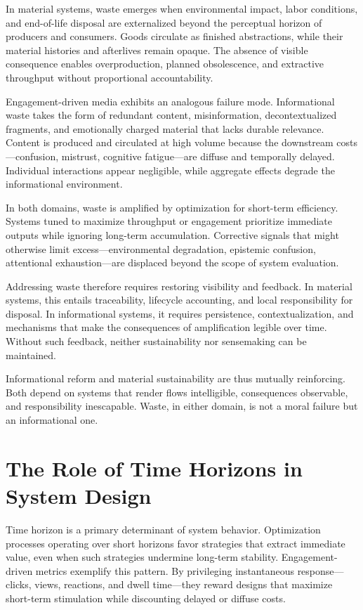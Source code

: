 \documentclass[12pt]{article}
\begin{document}
In material systems, waste emerges when environmental impact, labor conditions, and end-of-life disposal are externalized beyond the perceptual horizon of producers and consumers. Goods circulate as finished abstractions, while their material histories and afterlives remain opaque. The absence of visible consequence enables overproduction, planned obsolescence, and extractive throughput without proportional accountability.

Engagement-driven media exhibits an analogous failure mode. Informational waste takes the form of redundant content, misinformation, decontextualized fragments, and emotionally charged material that lacks durable relevance. Content is produced and circulated at high volume because the downstream costs—confusion, mistrust, cognitive fatigue—are diffuse and temporally delayed. Individual interactions appear negligible, while aggregate effects degrade the informational environment.

In both domains, waste is amplified by optimization for short-term efficiency. Systems tuned to maximize throughput or engagement prioritize immediate outputs while ignoring long-term accumulation. Corrective signals that might otherwise limit excess—environmental degradation, epistemic confusion, attentional exhaustion—are displaced beyond the scope of system evaluation.

Addressing waste therefore requires restoring visibility and feedback. In material systems, this entails traceability, lifecycle accounting, and local responsibility for disposal. In informational systems, it requires persistence, contextualization, and mechanisms that make the consequences of amplification legible over time. Without such feedback, neither sustainability nor sensemaking can be maintained.

Informational reform and material sustainability are thus mutually reinforcing. Both depend on systems that render flows intelligible, consequences observable, and responsibility inescapable. Waste, in either domain, is not a moral failure but an informational one.

\section{The Role of Time Horizons in System Design}

Time horizon is a primary determinant of system behavior. Optimization processes operating over short horizons favor strategies that extract immediate value, even when such strategies undermine long-term stability. Engagement-driven metrics exemplify this pattern. By privileging instantaneous response—clicks, views, reactions, and dwell time—they reward designs that maximize short-term stimulation while discounting delayed or diffuse costs.
\end{document}
